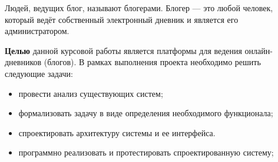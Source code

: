 Людей, ведущих блог, называют блогерами.
Блогер — это любой человек, который ведёт собственный электронный дневник и является его администратором.

\textbf{Целью} данной курсовой работы является платформы для ведения онлайн-дневников (блогов).
В рамках выполнения проекта необходимо решить следующие задачи:
\begin{itemize}
	\item провести анализ существующих систем;
	\item формализовать задачу в виде определения необходимого функционала;
	\item спроектировать архитектуру системы и ее интерфейса.
	\item программно реализовать и протестировать спроектированную систему;
\end{itemize}
